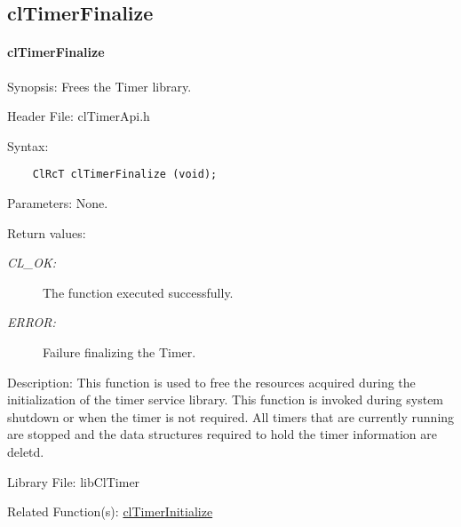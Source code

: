 \begin{flushleft}
\newpage

\subsection{clTimerFinalize}
\hypertarget{pagetmr103}{}\paragraph{cl\-Timer\-Finalize}\label{pagetmr103}
\begin{Desc}
\item[Synopsis:]Frees the Timer library.\end{Desc}
\begin{Desc}
\item[Header File:]clTimerApi.h\end{Desc}
\begin{Desc}
\item[Syntax:]

\footnotesize\begin{verbatim}    ClRcT clTimerFinalize (void);
\end{verbatim}
\normalsize
\end{Desc}
\begin{Desc}
\item[Parameters:]None.\end{Desc}
\begin{Desc}
\item[Return values:]
\begin{description}
\item[{\em CL\_\-OK:}]The function executed successfully.
\item[{\em ERROR:}]Failure finalizing the Timer.\end{description}
\end{Desc}
\begin{Desc}
\item[Description:]This function is used to free the resources acquired during the initialization of the timer service library. This function is invoked 
during
system shutdown or when the timer is not required. All timers that are currently running are stopped and the data structures required to hold the timer information
are deletd.\end{Desc}
\begin{Desc}
\item[Library File:]lib\-Cl\-Timer\end{Desc}
\begin{Desc}
\item[Related Function(s):]\hyperlink{pagetmr102}{cl\-Timer\-Initialize} \end{Desc}



\end{flushleft}
